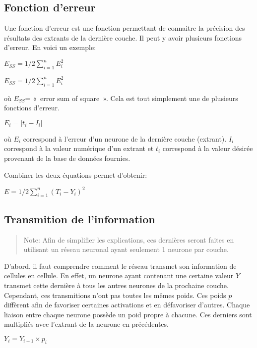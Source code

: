 \documentclass[letterpaper,10pt,french]{sphinxmanual}
\begin{document}
\subsection{Fonction d’erreur}
\label{\detokenize{training:fonction-d-erreur}}
Une fonction d’erreur est une fonction permettant de connaitre la précision des résultats des extrants de la dernière
couche. Il peut y avoir plusieurs fonctions d’erreur. En voici un exemple:

\(E_{SS}=1/2\sum_{i=1}^nE_i^2 \) 

\(E_{SS}=1/2\sum_{i=1}^nE_i^2 \) 

où \(E_{SS}\)= « error sum of square ». Cela est tout simplement une de plusieurs fonctions d’erreur.

\(E_i =|{t_i-I_i}|\) 

où \(E_i\) correspond à l’erreur d’un neurone de la dernière couche (extrant). \(I_i\) correspond à la valeur numérique
d’un extrant et \(t_i\) correspond à la valeur désirée provenant de la base de données fournies.

Combiner les deux équations permet d’obtenir:

\(E=1/2\sum_{i=1}^n({T_i-Y_i})^2\) 


\subsection{Transmition de l’information}
\label{\detokenize{training:transmition-de-l-information}}\begin{quote}

Note: Afin de simplifier les explications, ces dernières seront faites en utilisant un réseau neuronal ayant seulement 1 neurone par couche.
\end{quote}

D’abord, il faut comprendre comment le réseau transmet son information de cellules en cellule. En effet,
un neurone ayant contenant une certaine valeur \(Y\) transmet cette dernière à tous les autres neurones de
la prochaine couche. Cependant, ces transmitions n’ont pas toutes les mêmes poids. Ces poids \(p\) diffèrent
afin de favoriser certaines activations et en défavoriser d’autres. Chaque liaison entre chaque neurone possède
un poid propre à chacune. Ces derniers sont multipliés avec l’extrant de la neurone en précédentes.

\(Y_{i} = Y_{i-1}\times p_{i}\)
\end{document}
